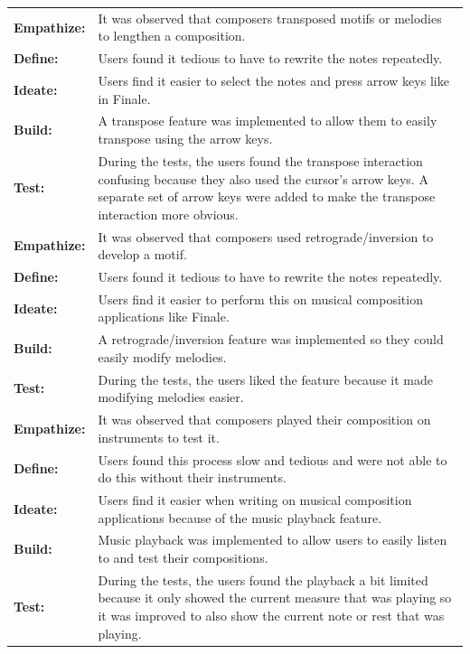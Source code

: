 \begin{longtable}{|p{2.5cm} p{12.5cm}|}
		  	\textbf{Empathize:} 	& It was observed that composers transposed motifs or melodies to lengthen a composition. \\
		  	\textbf{Define:} 		& Users found it tedious to have to rewrite the notes repeatedly. \\
		  	\textbf{Ideate:} 		& Users find it easier to select the notes and press arrow keys like in Finale. \\
		  	\textbf{Build:} 			& A transpose feature was implemented to allow them to easily transpose using the arrow keys. \\
		  	\textbf{Test:} 			& During the tests, the users found the transpose interaction confusing because they also used the cursor's arrow keys. A separate set of arrow keys were added to make the transpose interaction more obvious. \\
		  	\hline

		  	\textbf{Empathize:} 	& It was observed that composers used retrograde/inversion to develop a motif. \\
		  	\textbf{Define:} 		& Users found it tedious to have to rewrite the notes repeatedly. \\
		  	\textbf{Ideate:} 		& Users find it easier to perform this on musical composition applications like Finale. \\
		  	\textbf{Build:} 			& A retrograde/inversion feature was implemented so they could easily modify melodies. \\
		  	\textbf{Test:} 			& During the tests, the users liked the feature because it made modifying melodies easier. \\
		  	\hline

		  	\textbf{Empathize:} 	& It was observed that composers played their composition on instruments to test it.  \\
		  	\textbf{Define:} 		& Users found this process slow and tedious and were not able to do this without their instruments. \\
		  	\textbf{Ideate:} 		& Users find it easier when writing on musical composition applications because of the music playback feature. \\
		  	\textbf{Build:} 			& Music playback was implemented to allow users to easily listen to and test their compositions. \\
		  	\textbf{Test:} 			& During the tests, the users found the playback a bit limited because it only showed the current measure that was playing so it was improved to also show the current note or rest that was playing. \\
		  	\hline

		\end{longtable}

